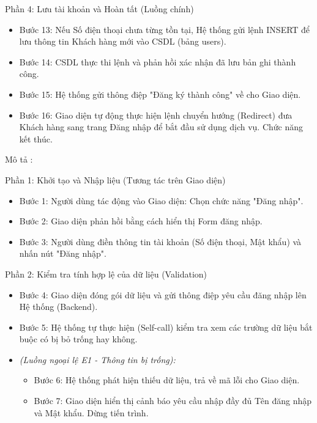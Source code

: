 \documentclass[../BTL.tex]{subfiles}
\begin{document}
Phần 4: Lưu tài khoản và Hoàn tất (Luồng chính)

\begin{itemize}
\item
  Bước 13: Nếu Số điện thoại chưa từng tồn tại, Hệ thống gửi lệnh INSERT
  để lưu thông tin Khách hàng mới vào CSDL (bảng users).
\item
  Bước 14: CSDL thực thi lệnh và phản hồi xác nhận đã lưu bản ghi thành
  công.
\item
  Bước 15: Hệ thống gửi thông điệp "Đăng ký thành công" về cho Giao
  diện.
\item
  Bước 16: Giao diện tự động thực hiện lệnh chuyển hướng (Redirect) đưa
  Khách hàng sang trang Đăng nhập để bắt đầu sử dụng dịch vụ. Chức năng
  kết thúc.
\end{itemize}


Mô tả :

Phần 1: Khởi tạo và Nhập liệu (Tương tác trên Giao diện)

\begin{itemize}
\item
  Bước 1: Người dùng tác động vào Giao diện: Chọn chức năng "Đăng nhập".
\item
  Bước 2: Giao diện phản hồi bằng cách hiển thị Form đăng nhập.
\item
  Bước 3: Người dùng điền thông tin tài khoản (Số điện thoại, Mật khẩu)
  và nhấn nút "Đăng nhập".
\end{itemize}

Phần 2: Kiểm tra tính hợp lệ của dữ liệu (Validation)

\begin{itemize}
\item
  Bước 4: Giao diện đóng gói dữ liệu và gửi thông điệp yêu cầu đăng nhập
  lên Hệ thống (Backend).
\item
  Bước 5: Hệ thống tự thực hiện (Self-call) kiểm tra xem các trường dữ
  liệu bắt buộc có bị bỏ trống hay không.
\item
  \emph{(Luồng ngoại lệ E1 - Thông tin bị trống):}

  \begin{itemize}
  \item
    Bước 6: Hệ thống phát hiện thiếu dữ liệu, trả về mã lỗi cho Giao
    diện.
  \item
    Bước 7: Giao diện hiển thị cảnh báo yêu cầu nhập đầy đủ Tên đăng
    nhập và Mật khẩu. Dừng tiến trình.
  \end{itemize}
\end{itemize}
\end{document}

